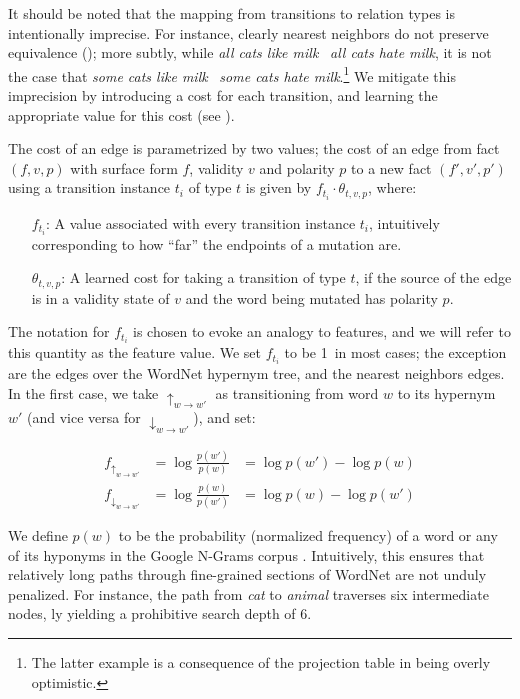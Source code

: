 It should be noted that the mapping from transitions to relation
  types is intentionally imprecise.
For instance, clearly nearest neighbors do not preserve equivalence
  (\equivalent); more subtly, while
  \textit{all cats like milk} \alternate\ \textit{all cats hate milk},
  it is not the case that
  \textit{some cats like milk} \alternate\ \textit{some cats hate milk}.\footnote{
    The latter example is a consequence of the projection table in
     being overly optimistic.
  }
We mitigate this imprecision by introducing a cost for each transition,
  and learning the appropriate value for this cost
  (see ).

The cost of an edge is parametrized by two values; the cost of an edge
  from fact $(f,v,p)$ with surface form $f$, validity
  $v$ and polarity $p$ to a new fact $(f',v',p')$ using a transition
  instance $t_i$ of type $t$ is given by
  $f_{t_i} \cdot \theta_{t,v,p}$, where:

\begin{itemize}
  \indentitem\item[$f_{t_i}$:]
    A value associated with every transition instance $t_i$, intuitively
      corresponding to how ``far'' the endpoints of a mutation are.
  \indentitem\item[$\theta_{t,v,p}$:]
    A learned cost for taking a transition of type $t$, if the source
    of the edge is in a validity state of $v$ and the word being mutated
    has polarity $p$.
\end{itemize}

The notation for $f_{t_i}$ is chosen to evoke an analogy to features,
  and we will refer to this quantity as the feature value.
We set $f_{t_i}$ to be 1\ in most cases;
  the exception are the edges over the WordNet hypernym tree,
  and the nearest neighbors edges.
In the first case, we take $\uparrow_{w \rightarrow w'}$ as transitioning
  from word $w$ to its hypernym $w'$ (and vice versa for
  $\downarrow_{w \rightarrow w'}$), and set:

\begin{align*}
  f_{\uparrow_{w \rightarrow w'}}   &= \log \frac{p(w')}{p(w)} &= \log p(w') - \log p(w) \\
  f_{\downarrow_{w \rightarrow w'}} &= \log \frac{p(w)}{p(w')} &= \log p(w) - \log p(w')
\end{align*}

We define $p(w)$ to be the probability (normalized frequency)
  of a word or any of its hyponyms in the Google N-Grams corpus
  \cite{key:2006brants-ngrams}.
Intuitively, this ensures that relatively long paths through fine-grained
  sections of WordNet are not unduly penalized.
For instance, the path from \textit{cat} to \textit{animal} traverses
  six intermediate nodes, \naive ly yielding a prohibitive
  search depth of 6.

